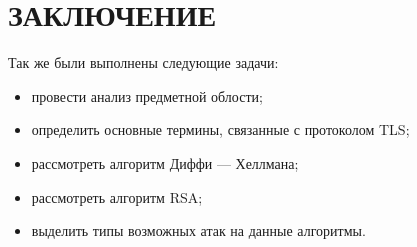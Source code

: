 \chapter*{ЗАКЛЮЧЕНИЕ}

    
    Так же были выполнены следующие задачи:
    
    \begin{itemize}
        \item провести анализ предметной облости;
        \item определить основные термины, связанные с протоколом TLS;
        \item рассмотреть алгоритм Диффи --- Хеллмана;
        \item рассмотреть алгоритм RSA;
        \item выделить типы возможных атак на данные алгоритмы. 
    \end{itemize}
